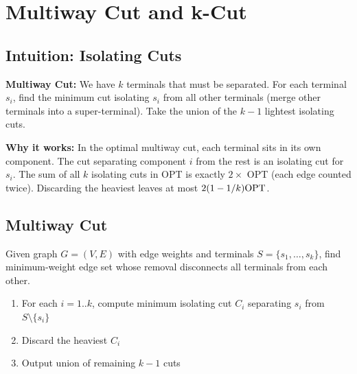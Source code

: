 \setcounter{chapter}{3}
\chapter{Multiway Cut and k-Cut}
\label{ch:multiway}

\section{Intuition: Isolating Cuts}

\begin{intuitionbox}
\textbf{Multiway Cut:} We have $k$ terminals that must be separated. For each terminal $s_i$, find the minimum cut isolating $s_i$ from all other terminals (merge other terminals into a super-terminal). Take the union of the $k-1$ lightest isolating cuts.

\textbf{Why it works:} In the optimal multiway cut, each terminal sits in its own component. The cut separating component $i$ from the rest is an isolating cut for $s_i$. The sum of all $k$ isolating cuts in OPT is exactly $2 \times$ OPT (each edge counted twice). Discarding the heaviest leaves at most $2(1-1/k)\mathrm{OPT}$.
\end{intuitionbox}

\section{Multiway Cut}

\begin{definition}
Given graph $G = (V, E)$ with edge weights and terminals $S = \{s_1, \dots, s_k\}$, find minimum-weight edge set whose removal disconnects all terminals from each other.
\end{definition}

\begin{algorithmdef}
\begin{enumerate}
    \item For each $i = 1..k$, compute minimum isolating cut $C_i$ separating $s_i$ from $S \setminus \{s_i\}$
    \item Discard the heaviest $C_i$
    \item Output union of remaining $k-1$ cuts
\end{enumerate}
\end{algorithmdef}

